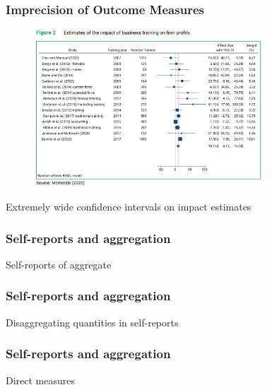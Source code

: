 \documentclass[hideothersubsections, usenames,dvipsnames,11pt]{beamer}
\newenvironment{itemize_2pt}{\itemize\addtolength{\itemsep}{2pt}}{\enditemize}
\begin{document}
\begin{frame}
\frametitle{Imprecision of Outcome Measures}
	
	\begin{figure}[htbp]
		\centering
		\includegraphics[width=23.5em]{pics/McK2020_profits.png}
		\label{McKenzie(2020): Profits}
	\end{figure}	
	
\vspace{-1em}	
	
	\begin{itemize_2pt}
		\item \textcolor{bdf}{Extremely wide confidence intervals} on impact estimates
	\vspace{0.1in}
	\end{itemize_2pt}
\end{frame}

\begin{frame}
\frametitle{Self-reports and aggregation}
	\begin{itemize_2pt}
	\item Self-reports of aggregate \citep{deMel2009}
	\vspace{0.1in}
	\end{itemize_2pt}
\end{frame}

\begin{frame}
\frametitle{Self-reports and aggregation}
	\begin{itemize_2pt}
	\item Disaggregating quantities in self-reports \citep{deMel2009}
	\vspace{0.1in}
	\end{itemize_2pt}
\end{frame}

\begin{frame}
\frametitle{Self-reports and aggregation}
	\begin{itemize_2pt}
	\item Direct measures \citep{deMel2009}
	\vspace{0.1in}
	\end{itemize_2pt}
\end{frame}
\end{document}
